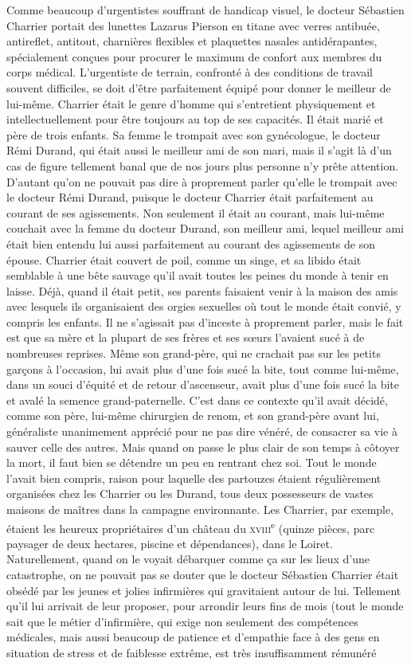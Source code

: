 Comme beaucoup d’urgentistes souffrant de handicap visuel, le docteur Sébastien Charrier portait des lunettes Lazarus Pierson en titane avec verres antibuée, antireflet, antitout, charnières flexibles et plaquettes nasales antidérapantes, spécialement conçues pour procurer le maximum de confort aux membres du corps médical. L’urgentiste de terrain, confronté à des conditions de travail souvent difficiles, se doit d’être parfaitement équipé pour donner le meilleur de lui-même. Charrier était le genre d’homme qui s’entretient physiquement et intellectuellement pour être toujours au top de ses capacités. Il était marié et père de trois enfants. Sa femme le trompait avec son gynécologue, le docteur Rémi Durand, qui était aussi le meilleur ami de son mari, mais il s’agit là d’un cas de figure tellement banal que de nos jours plus personne n’y prête attention. D’autant qu’on ne pouvait pas dire à proprement parler qu’elle le trompait avec le docteur Rémi Durand, puisque le docteur Charrier était parfaitement au courant de ses agissements. Non seulement il était au courant, mais lui-même couchait avec la femme du docteur Durand, son meilleur ami, lequel meilleur ami était bien entendu lui aussi parfaitement au courant des agissements de son épouse. Charrier était couvert de poil, comme un singe, et sa libido était semblable à une bête sauvage qu’il avait toutes les peines du monde à tenir en laisse. Déjà, quand il était petit, ses parents faisaient venir à la maison des amis avec lesquels ils organisaient des orgies sexuelles où tout le monde était convié, y compris les enfants. Il ne s’agissait pas d’inceste à proprement parler, mais le fait est que sa mère et la plupart de ses frères et ses sœurs l’avaient sucé à de nombreuses reprises. Même son grand-père, qui ne crachait pas sur les petits garçons à l’occasion, lui avait plus d’une fois sucé la bite, tout comme lui-même, dans un souci d’équité et de retour d’ascenseur, avait plus d’une fois sucé la bite et avalé la semence grand-paternelle. C’est dans ce contexte qu’il avait décidé, comme son père, lui-même chirurgien de renom, et son grand-père avant lui, généraliste unanimement apprécié pour ne pas dire vénéré, de consacrer sa vie à sauver celle des autres. Mais quand on passe le plus clair de son temps à côtoyer la mort, il faut bien se détendre un peu en rentrant chez soi. Tout le monde l’avait bien compris, raison pour laquelle des partouzes étaient régulièrement organisées chez les Charrier ou les Durand, tous deux possesseurs de vastes maisons de maîtres dans la campagne environnante. Les Charrier, par exemple, étaient les heureux propriétaires d’un château du \textsc{xviii}\textsuperscript{e} (quinze pièces, parc paysager de deux hectares, piscine et dépendances), dans le Loiret. Naturellement, quand on le voyait débarquer comme ça sur les lieux d’une catastrophe, on ne pouvait pas se douter que le docteur Sébastien Charrier était obsédé par les jeunes et jolies infirmières qui gravitaient autour de lui. Tellement qu’il lui arrivait de leur proposer, pour arrondir leurs fins de mois (tout le monde sait que le métier d’infirmière, qui exige non seulement des compétences médicales, mais aussi beaucoup de patience et d’empathie face à des gens en situation de stress et de faiblesse extrême, est très insuffisamment rémunéré 
